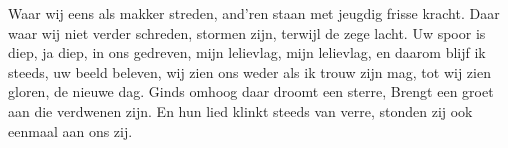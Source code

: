 \beginverse*
Waar wij eens als makker streden,
and’ren staan met jeugdig frisse kracht.
Daar waar wij niet verder schreden,
stormen zijn, terwijl de zege lacht.
\endverse
\beginchorus
Uw spoor is diep, ja diep,
in ons gedreven,
mijn lelievlag, mijn lelievlag,
en daarom blijf ik steeds,
uw beeld beleven,
wij zien ons weder als ik trouw zijn mag,
tot wij zien gloren, de nieuwe dag.
\endchorus
\beginverse*
Ginds omhoog daar droomt een sterre,
Brengt een groet aan die verdwenen zijn.
En hun lied klinkt steeds van verre,
stonden zij ook eenmaal aan ons zij.
\endverse
\endsong